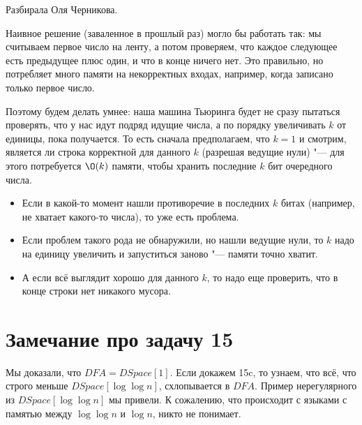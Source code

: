 	Разбирала Оля Черникова.

	Наивное решение (заваленное в прошлый раз) могло бы работать так: мы считываем первое число на ленту,
	а потом проверяем, что каждое следующее есть предыдущее плюс один, и что в конце ничего нет.
	Это правильно, но потребляет много памяти на некорректных входах, например, когда записано только первое число.

	Поэтому будем делать умнее: наша машина Тьюринга будет не сразу пытаться проверять, что у нас идут подряд идущие числа,
	а по порядку увеличивать $k$ от единицы, пока получается.
	То есть сначала предполагаем, что $k=1$ и смотрим, является ли строка корректной для данного $k$
	(разрешая ведущие нули) "--- для этого потребуется $\O(k)$ памяти, чтобы хранить последние $k$ бит очередного числа.
	\begin{itemize}
		\item Если в какой-то момент нашли противоречие в последних $k$ битах (например, не хватает какого-то числа), то уже есть проблема.
		\item Если проблем такого рода не обнаружили, но нашли ведущие нули, то $k$ надо на единицу увеличить и запуститься заново "--- памяти точно хватит.
		\item А если всё выглядит хорошо для данного $k$, то надо еще проверить, что в конце строки нет никакого мусора.
	\end{itemize}

\section{Замечание про задачу 15}
	Мы доказали, что $DFA=DSpace[1]$.
	Если докажем 15c, то узнаем, что всё, что строго меньше $DSpace[\log \log n]$,
	схлопывается в $DFA$.
	Пример нерегулярного из $DSpace[\log \log n]$ мы привели.
	К сожалению, что происходит с языками с памятью между $\log \log n$ и $\log n$, никто не понимает.
